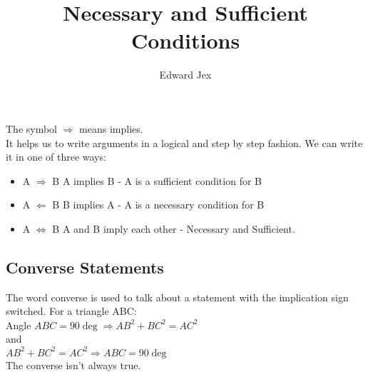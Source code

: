 \documentclass[a4paper,12pt]{article}
\begin{document}
\title{Necessary and Sufficient Conditions}	
\author{Edward Jex}
\maketitle
The symbol $\Rightarrow$ means implies. \\
It helps us to write arguments in a logical and step by step fashion.
We can write it in one of three ways:
\begin{itemize}
	\item A $\Rightarrow$ B	A implies B - A is a sufficient condition for B
	\item A $\Leftarrow$ B		B implies A - A is a necessary condition for B
	\item A $\iff$ B			A and B imply each other - Necessary and Sufficient.
\end{itemize}
\subsection*{Converse Statements}
The word converse is used to talk about a statement with the implication sign switched. 
For a triangle ABC: \\
Angle $ABC = 90\deg \Rightarrow AB^2 + BC^2 = AC^2$ \\ 
and \\
$AB^2 + BC^2 = AC^2 \Rightarrow ABC = 90\deg$ \\ 

The converse isn't always true.
\end{document}
